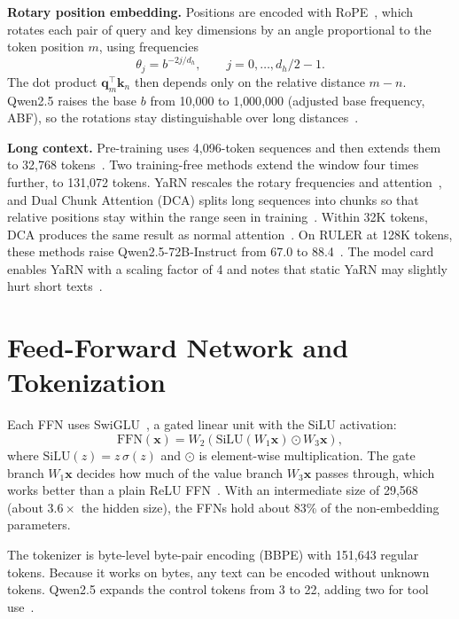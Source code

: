 \documentclass[conference]{IEEEtran}
\begin{document}
\textbf{Rotary position embedding.} Positions are encoded with RoPE~\cite{rope}, which rotates each pair of query and key dimensions by an angle proportional to the token position $m$, using frequencies
\begin{equation}
\theta_j=b^{-2j/d_h},\qquad j=0,\dots,d_h/2-1.
\end{equation}
The dot product $\mathbf{q}_m^{\top}\mathbf{k}_n$ then depends only on the relative distance $m-n$. Qwen2.5 raises the base $b$ from 10{,}000 to 1{,}000{,}000 (adjusted base frequency, ABF), so the rotations stay distinguishable over long distances~\cite{qwen25}.

\textbf{Long context.} Pre-training uses 4,096-token sequences and then extends them to 32,768 tokens~\cite{qwen25}. Two training-free methods extend the window four times further, to 131,072 tokens. YaRN rescales the rotary frequencies and attention~\cite{yarn}, and Dual Chunk Attention (DCA) splits long sequences into chunks so that relative positions stay within the range seen in training~\cite{dca,qwen2}. Within 32K tokens, DCA produces the same result as normal attention~\cite{qwen2}. On RULER at 128K tokens, these methods raise Qwen2.5-72B-Instruct from 67.0 to 88.4~\cite{qwen25}. The model card enables YaRN with a scaling factor of 4 and notes that static YaRN may slightly hurt short texts~\cite{qwen25card}.

\section{Feed-Forward Network and Tokenization}
Each FFN uses SwiGLU~\cite{glu}, a gated linear unit with the SiLU activation:
\begin{equation}
\mathrm{FFN}(\mathbf{x})=W_2\left(\mathrm{SiLU}(W_1\mathbf{x})\odot W_3\mathbf{x}\right),
\end{equation}
where $\mathrm{SiLU}(z)=z\,\sigma(z)$ and $\odot$ is element-wise multiplication. The gate branch $W_1\mathbf{x}$ decides how much of the value branch $W_3\mathbf{x}$ passes through, which works better than a plain ReLU FFN~\cite{glu}. With an intermediate size of 29{,}568 (about $3.6\times$ the hidden size), the FFNs hold about 83\% of the non-embedding parameters.

The tokenizer is byte-level byte-pair encoding (BBPE) with 151,643 regular tokens. Because it works on bytes, any text can be encoded without unknown tokens. Qwen2.5 expands the control tokens from 3 to 22, adding two for tool use~\cite{qwen25}.
\end{document}
